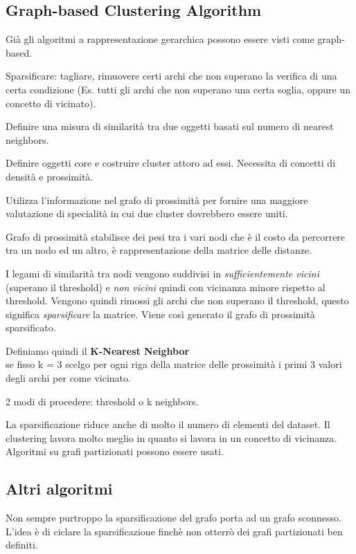 \subsection{Graph-based Clustering Algorithm}
Gi\`a gli algoritmi a rappresentazione gerarchica possono essere visti come graph-based. 

Sparsificare: tagliare, rimuovere certi archi che non superano la verifica di una certa condizione (Es. tutti gli archi che non superano una certa soglia, oppure un concetto di vicinato). 

Definire una misura di similarit\`a tra due oggetti basati sul numero di nearest neighbors. 

Definire oggetti core e costruire cluster attoro ad essi. Necessita di concetti di densit\`a e prossimit\`a.

Utilizza l'informazione nel grafo di prossimit\`a per fornire una maggiore valutazione di specialit\`a in cui due cluster dovrebbero essere uniti. 

Grafo di prossimit\`a stabilisce dei pesi tra i vari nodi che \`e il costo da percorrere tra un nodo ed un altro, \`e rappresentazione della matrice delle distanze. 

I legami di similarit\`a tra nodi vengono suddivisi in \textit{sufficientemente vicini} (superano il threshold) e \textit{non vicini} quindi con vicinanza minore rispetto al threshold. Vengono quindi rimossi gli archi che non superano il threshold, questo significa \textit{sparsificare} la matrice. Viene cos\`i generato il grafo di prossimit\`a sparsificato.

Definiamo quindi il \textbf{K-Nearest Neighbor}\\
se fisso k = 3 scelgo per ogni riga della matrice delle prossimit\`a i primi 3 valori degli archi per come vicinato. 

2 modi di procedere: threshold o k neighbors.

La sparsificazione riduce anche di molto il numero di elementi del dataset. Il clustering lavora molto meglio in quanto si lavora in un concetto di vicinanza. Algoritmi su grafi partizionati possono essere usati. 

\subsection{Altri algoritmi}
Non sempre purtroppo la sparsificazione del grafo porta ad un grafo sconnesso. L'idea \`e di ciclare la sparsificazione finch\`e non otterr\`o dei grafi partizionati ben definiti. 

